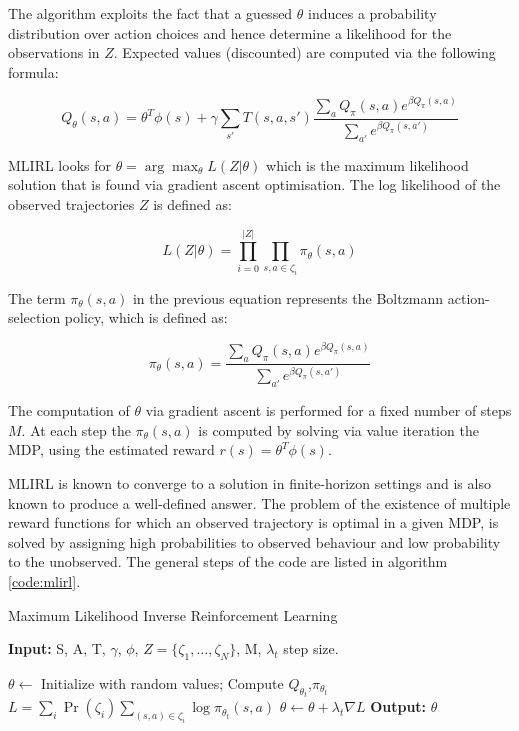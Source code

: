 The algorithm exploits the fact that a guessed $\theta$ induces a probability distribution over action choices and hence determine a likelihood for the observations in $Z$. Expected values (discounted) are computed via the following formula:

$$Q_\theta(s,a) = \theta^T\phi(s)+\gamma\sum_{s'}T(s,a,s')\frac{\sum_a Q_\pi(s,a)e^{\beta Q_\pi(s,a)}}{\sum_{a'}e^{\beta Q_\pi(s,a')} }$$

MLIRL looks for $\theta = \arg\max_\theta L(Z|\theta)$ which is the maximum likelihood solution that is found via gradient ascent optimisation. 
The log likelihood of the observed trajectories $Z$ is defined as:

$$L(Z|\theta) = \prod_{i=0}^{|Z|} \prod_{s,a \in \zeta_i} \pi_\theta(s,a)$$

The term $\pi_\theta(s,a)$ in the previous equation represents the Boltzmann action-selection policy, which is defined as:

$$\pi_\theta(s,a) = \frac{\sum_a Q_\pi(s,a)e^{\beta Q_\pi(s,a)}}{\sum_{a'}e^{\beta Q_\pi(s,a')}}$$

The computation of $\theta$ via gradient ascent is performed for a fixed number of steps $M$. At each step the $\pi_\theta(s,a)$ is computed by solving via value iteration the MDP, using the estimated reward $r(s) = \theta^T \phi(s)$.

MLIRL is known to converge to a solution in finite-horizon settings and is also known to produce a well-defined answer. The problem of the existence of multiple reward functions for which an observed trajectory is optimal in a given MDP, is solved by assigning high probabilities to observed behaviour and low probability to the unobserved. The general steps of the code are listed in algorithm \ref{code:mlirl}.

\begin{algorithm}
	\caption{Maximum Likelihood Inverse Reinforcement Learning}
	\label{code:mlirl}
	\begin{algorithmic}
		\State \textbf{Input:} S, A, T, $\gamma$, $\phi$, $Z=\lbrace \zeta_1, \dots,  \zeta_N \rbrace$, M, $\lambda_t$ step size.
		
		\State $\theta \leftarrow$ Initialize with random values;
		\State Compute $Q_{\theta_t}$,$\pi_{\theta_t}$
		\State $L = \sum_{i} \Pr{(\zeta_i)} \sum_{(s,a) \in \zeta_i} \log{\pi_{\theta_t}(s,a)}$
		\State $\theta \leftarrow \theta + \lambda_t\nabla{L}$
		\EndFor
		\State \textbf{Output:}  $\theta$
	\end{algorithmic}
\end{algorithm}

